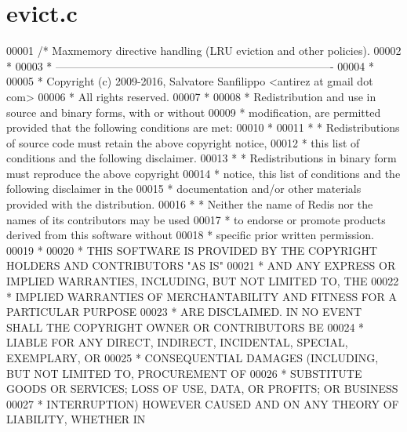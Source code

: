 \hypertarget{evict_8c_source}{}\section{evict.\+c}
\label{evict_8c_source}

\begin{DoxyCode}
00001 \textcolor{comment}{/* Maxmemory directive handling (LRU eviction and other policies).}
00002 \textcolor{comment}{ *}
00003 \textcolor{comment}{ * ----------------------------------------------------------------------------}
00004 \textcolor{comment}{ *}
00005 \textcolor{comment}{ * Copyright (c) 2009-2016, Salvatore Sanfilippo <antirez at gmail dot com>}
00006 \textcolor{comment}{ * All rights reserved.}
00007 \textcolor{comment}{ *}
00008 \textcolor{comment}{ * Redistribution and use in source and binary forms, with or without}
00009 \textcolor{comment}{ * modification, are permitted provided that the following conditions are met:}
00010 \textcolor{comment}{ *}
00011 \textcolor{comment}{ *   * Redistributions of source code must retain the above copyright notice,}
00012 \textcolor{comment}{ *     this list of conditions and the following disclaimer.}
00013 \textcolor{comment}{ *   * Redistributions in binary form must reproduce the above copyright}
00014 \textcolor{comment}{ *     notice, this list of conditions and the following disclaimer in the}
00015 \textcolor{comment}{ *     documentation and/or other materials provided with the distribution.}
00016 \textcolor{comment}{ *   * Neither the name of Redis nor the names of its contributors may be used}
00017 \textcolor{comment}{ *     to endorse or promote products derived from this software without}
00018 \textcolor{comment}{ *     specific prior written permission.}
00019 \textcolor{comment}{ *}
00020 \textcolor{comment}{ * THIS SOFTWARE IS PROVIDED BY THE COPYRIGHT HOLDERS AND CONTRIBUTORS "AS IS"}
00021 \textcolor{comment}{ * AND ANY EXPRESS OR IMPLIED WARRANTIES, INCLUDING, BUT NOT LIMITED TO, THE}
00022 \textcolor{comment}{ * IMPLIED WARRANTIES OF MERCHANTABILITY AND FITNESS FOR A PARTICULAR PURPOSE}
00023 \textcolor{comment}{ * ARE DISCLAIMED. IN NO EVENT SHALL THE COPYRIGHT OWNER OR CONTRIBUTORS BE}
00024 \textcolor{comment}{ * LIABLE FOR ANY DIRECT, INDIRECT, INCIDENTAL, SPECIAL, EXEMPLARY, OR}
00025 \textcolor{comment}{ * CONSEQUENTIAL DAMAGES (INCLUDING, BUT NOT LIMITED TO, PROCUREMENT OF}
00026 \textcolor{comment}{ * SUBSTITUTE GOODS OR SERVICES; LOSS OF USE, DATA, OR PROFITS; OR BUSINESS}
00027 \textcolor{comment}{ * INTERRUPTION) HOWEVER CAUSED AND ON ANY THEORY OF LIABILITY, WHETHER IN}

\end{DoxyCode}

